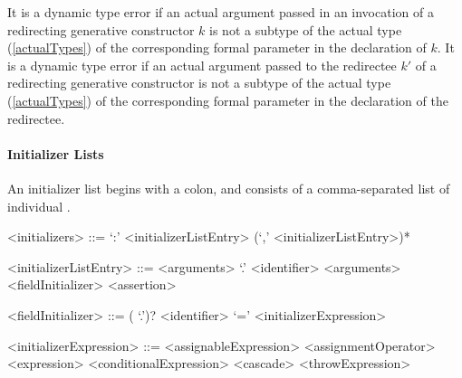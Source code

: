 \documentclass[makeidx]{article}
\begin{document}
\LMHash{}%
It is a dynamic type error if an actual argument passed
in an invocation of a redirecting generative constructor $k$
is not a subtype of the actual type (\ref{actualTypes})
of the corresponding formal parameter in the declaration of $k$.
It is a dynamic type error if an actual argument passed
to the redirectee $k'$ of a redirecting generative constructor
is not a subtype of the actual type
(\ref{actualTypes})
of the corresponding formal parameter in the declaration of the redirectee.


\paragraph{Initializer Lists}

\LMHash{}%
An initializer list begins with a colon,
and consists of a comma-separated list of individual .


\begin{grammar}
<initializers> ::= `:' <initializerListEntry> (`,' <initializerListEntry>)*

<initializerListEntry> ::= \SUPER{} <arguments>
  \alt \SUPER{} `.' <identifier> <arguments>
  \alt <fieldInitializer>
  \alt <assertion>

<fieldInitializer> ::= \gnewline{}
  (\THIS{} `.')? <identifier> `=' <initializerExpression>

<initializerExpression> ::= \gnewline{}
  <assignableExpression> <assignmentOperator> <expression>
  \alt <conditionalExpression>
  \alt <cascade>
  \alt <throwExpression>
\end{grammar}
\end{document}
